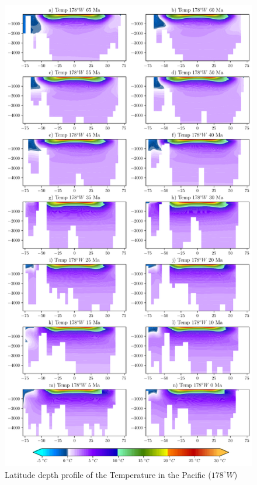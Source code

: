 \documentclass[a4paper]{article}
\begin{document}
\begin{figure}[ht]
	\centering
	\includegraphics[width=0.7\linewidth]{full_pacific_sst.pdf}
	\caption{Latitude depth profile of the Temperature in the Pacific ($178^{\circ} W$)}
	\label{fig:pacsst_total}
\end{figure}
\end{document}
